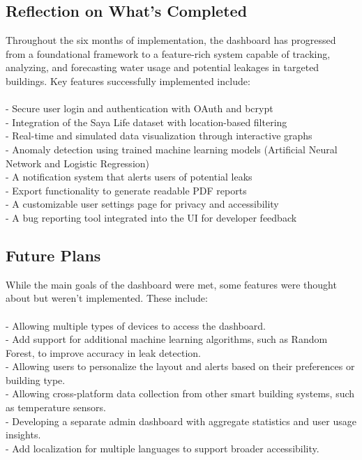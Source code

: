 \documentclass[10pt]{article}
\begin{document}
\subsection*{Reflection on What's Completed}
Throughout the six months of implementation, the dashboard has progressed from a foundational framework to a feature-rich system capable of tracking, analyzing, and forecasting water usage and potential leakages in targeted buildings. Key features successfully implemented include:\\
\\- Secure user login and authentication with OAuth and bcrypt\\
- Integration of the Saya Life dataset with location-based filtering\\
- Real-time and simulated data visualization through interactive graphs\\
- Anomaly detection using trained machine learning models (Artificial Neural Network and Logistic Regression)\\
- A notification system that alerts users of potential leaks\\
- Export functionality to generate readable PDF reports\\
- A customizable user settings page for privacy and accessibility\\
- A bug reporting tool integrated into the UI for developer feedback
\subsection*{Future Plans}
While the main goals of the dashboard were met, some features were thought about but weren't implemented. These include:\\
\\- Allowing multiple types of devices to access the dashboard.\\
- Add support for additional machine learning algorithms, such as Random Forest, to improve accuracy in leak detection.\\
- Allowing users to personalize the layout and alerts based on their preferences or building type.\\
- Allowing cross-platform data collection from other smart building systems, such as temperature sensors.\\
- Developing a separate admin dashboard with aggregate statistics and user usage insights.\\
- Add localization for multiple languages to support broader accessibility.
\end{document}
